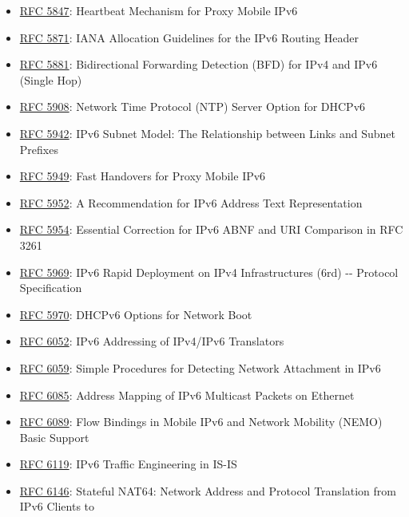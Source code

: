 \documentclass[
]{article}
\begin{document}
\begin{itemize}
\item
  \href{https://www.rfc-editor.org/info/rfc5847}{RFC 5847}: Heartbeat
  Mechanism for Proxy Mobile IPv6
\item
  \href{https://www.rfc-editor.org/info/rfc5871}{RFC 5871}: IANA
  Allocation Guidelines for the IPv6 Routing Header
\item
  \href{https://www.rfc-editor.org/info/rfc5881}{RFC 5881}:
  Bidirectional Forwarding Detection (BFD) for IPv4 and IPv6 (Single
  Hop)
\item
  \href{https://www.rfc-editor.org/info/rfc5908}{RFC 5908}: Network Time
  Protocol (NTP) Server Option for DHCPv6
\item
  \href{https://www.rfc-editor.org/info/rfc5942}{RFC 5942}: IPv6 Subnet
  Model: The Relationship between Links and Subnet Prefixes
\item
  \href{https://www.rfc-editor.org/info/rfc5949}{RFC 5949}: Fast
  Handovers for Proxy Mobile IPv6
\item
  \href{https://www.rfc-editor.org/info/rfc5952}{RFC 5952}: A
  Recommendation for IPv6 Address Text Representation
\item
  \href{https://www.rfc-editor.org/info/rfc5954}{RFC 5954}: Essential
  Correction for IPv6 ABNF and URI Comparison in RFC 3261
\item
  \href{https://www.rfc-editor.org/info/rfc5969}{RFC 5969}: IPv6 Rapid
  Deployment on IPv4 Infrastructures (6rd) -\/- Protocol Specification
\item
  \href{https://www.rfc-editor.org/info/rfc5970}{RFC 5970}: DHCPv6
  Options for Network Boot
\item
  \href{https://www.rfc-editor.org/info/rfc6052}{RFC 6052}: IPv6
  Addressing of IPv4/IPv6 Translators
\item
  \href{https://www.rfc-editor.org/info/rfc6059}{RFC 6059}: Simple
  Procedures for Detecting Network Attachment in IPv6
\item
  \href{https://www.rfc-editor.org/info/rfc6085}{RFC 6085}: Address
  Mapping of IPv6 Multicast Packets on Ethernet
\item
  \href{https://www.rfc-editor.org/info/rfc6089}{RFC 6089}: Flow
  Bindings in Mobile IPv6 and Network Mobility (NEMO) Basic Support
\item
  \href{https://www.rfc-editor.org/info/rfc6119}{RFC 6119}: IPv6 Traffic
  Engineering in IS-IS
\item
  \href{https://www.rfc-editor.org/info/rfc6146}{RFC 6146}: Stateful
  NAT64: Network Address and Protocol Translation from IPv6 Clients to

\end{itemize}
\end{document}
